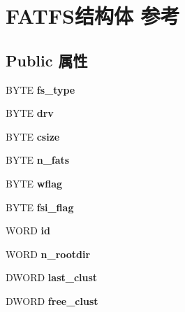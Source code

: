 \hypertarget{struct_f_a_t_f_s}{}\section{F\+A\+T\+F\+S结构体 参考}
\label{struct_f_a_t_f_s}
\subsection*{Public 属性}
\begin{DoxyCompactItemize}
\item 
\mbox{\label{struct_f_a_t_f_s_add27d97babe807b573eac98a71dc4ae5}} 
B\+Y\+TE {\bfseries fs\+\_\+type}
\item 
\mbox{\label{struct_f_a_t_f_s_a6a791560e2687e8b1569bfce61208d2d}} 
B\+Y\+TE {\bfseries drv}
\item 
\mbox{\label{struct_f_a_t_f_s_a504a1175f6dcc9a854b9da94463bd108}} 
B\+Y\+TE {\bfseries csize}
\item 
\mbox{\label{struct_f_a_t_f_s_a56716c7e7ac10cf46e73ffb2a2e9b545}} 
B\+Y\+TE {\bfseries n\+\_\+fats}
\item 
\mbox{\label{struct_f_a_t_f_s_a647e43c9ccae94b7274793d1909897de}} 
B\+Y\+TE {\bfseries wflag}
\item 
\mbox{\label{struct_f_a_t_f_s_a84e9cdc5a6a8e33ea7ec192058abf161}} 
B\+Y\+TE {\bfseries fsi\+\_\+flag}
\item 
\mbox{\label{struct_f_a_t_f_s_a417095d7c20d56d417dc0998e0dd5a5c}} 
W\+O\+RD {\bfseries id}
\item 
\mbox{\label{struct_f_a_t_f_s_a189a00aa038044ffad0fc7f7dcf2aae1}} 
W\+O\+RD {\bfseries n\+\_\+rootdir}
\item 
\mbox{\label{struct_f_a_t_f_s_ad315def289218e26ab78ff90fde700d1}} 
D\+W\+O\+RD {\bfseries last\+\_\+clust}
\item 
\mbox{\label{struct_f_a_t_f_s_a5fb49e6ac511bd97eaffdd636d0e4165}} 
D\+W\+O\+RD {\bfseries free\+\_\+clust}

\end{DoxyCompactItemize}
